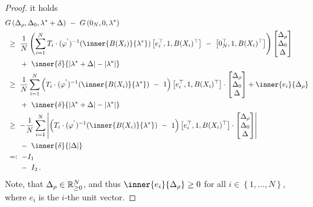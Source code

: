 \begin{proof}
it holds
\begin{align}
\label{99909}
\begin{split}
  &
  G
   \left( 
\Delta_\rho,\Delta_0,\lambda^*+\Delta
   \right)
   \ 
   -
   \ 
   G
   \left(
0_N,0,\lambda^*
   \right)
   \\
   &
   \ 
   \ge
   \ 
   \frac{1}{N}
  \left( 
\sum_{i=1} 
  ^N
  T_i
  \cdot
  (
  \varphi^{'}
  )
  ^{-1}
  \!
  \left( 
\inner
{B(X_i)}
{
\lambda^*
}
  \right)
  \left[ 
    e_i^\top,1,B(X_i)^\top
  \right]
  \ 
  -
  \ 
  \left[ 
    0_N^\top,1,B(X_i)^\top
  \right]
  \right)
  \begin{bmatrix}
    \Delta_\rho\\\Delta_0\\\Delta
  \end{bmatrix}
    \\
  &
  \qquad
  +
  \ 
  \inner{\delta}
  {|
\lambda^*
+
\Delta
  |
  -
  |
\lambda^*
  |
}
\\
   &
   \ 
   \ge
   \ 
   \frac{1}{N}
\sum_{i=1} 
  ^N
  \left( 
    T_i\cdot
  (
  \varphi^{'}
  )
  ^{-1}
  \!
  \left( 
\inner
{B(X_i)}
{
\lambda^*
}
  \right)
  \ 
  -
  \ 
  1
  \right)
  \left[ 
    e_i^\top,1,B(X_i)^\top
  \right]
  \cdot
  \begin{bmatrix}
    \Delta_\rho\\\Delta_0\\\Delta
  \end{bmatrix}
  +
  \inner{e_i}{\Delta_\rho}
  \\
  &
  \qquad
  +
  \ 
  \inner{\delta}
  {|
\lambda^*
+
\Delta
  |
  -
  |
\lambda^*
  |
}
\\
   &
   \ 
   \ge
   \ 
   -
   \frac{1}{N}
\sum_{i=1} 
  ^N
  \left|
   \left( 
     T_i\cdot
  (
  \varphi^{'}
  )
  ^{-1}
  \!
  \left( 
\inner
{B(X_i)}
{
\lambda^*
}
  \right)
  \ 
  -
  \ 
  1
  \right)
  \left[ 
    e_i^\top,1,B(X_i)^\top
  \right]
  \cdot
  \begin{bmatrix}
    \Delta_\rho\\\Delta_0\\\Delta
  \end{bmatrix}
  \right|
  \\
  &
  \qquad
  -
  \ 
  \inner{\delta}
  {|
\Delta
  |
}
\\
&
\
=:
\ 
-
I_1
\\
&
\qquad
-
\
 I_2
 \,.
\end{split}
\end{align}
Note, that $\Delta_\rho\in \mathbb{R}^N_{\ge 0}$, and thus $\inner{e_i}{\Delta_\rho}\ge 0$ for all $i\in \left\{ 1,\ldots,N \right\}$, where $e_i$ is the $i$-the unit vector.

\end{proof}
